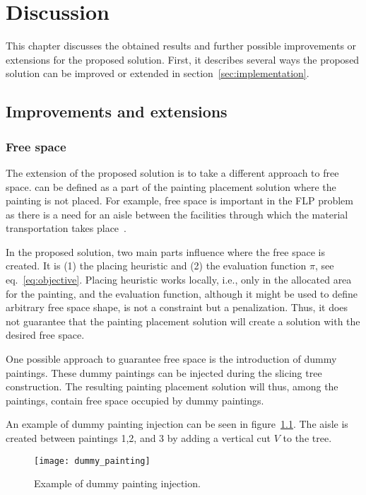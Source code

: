 \chapter{Discussion}\label{ch:discussion}

This chapter discusses the obtained results and further possible improvements or extensions for the proposed solution.
First, it describes several ways the proposed solution can be improved or extended in section~\ref{sec:implementation}.


\section{Improvements and extensions}\label{sec:improvements}

\subsection{Free space}\label{subsec:free-space}

The extension of the proposed solution is to take a different approach to free space.
 can be defined as a part of the painting placement solution where the painting is not placed.
For example, free space is important in the FLP problem as there is a need for an aisle between the facilities
through which the material transportation takes place~\cite{scholzExtensionsSTaTSPractical2010}.

In the proposed solution, two main parts influence where the free space is created.
It is (1) the placing heuristic and (2) the evaluation function $\pi$, see eq.~\ref{eq:objective}.
Placing heuristic works locally, i.e., only in the allocated area for the painting, and the evaluation
function, although it might be used to define arbitrary free space shape, is not a constraint but a penalization.
Thus, it does not guarantee that the painting placement solution will create a solution with the desired free space.

One possible approach to guarantee free space is the introduction of dummy paintings.
These dummy paintings can be injected during the slicing tree construction.
The resulting painting placement solution will thus, among the paintings, contain free space occupied by dummy paintings.

An example of dummy painting injection can be seen in figure~\ref{fig:dummy-painting}.
The aisle is created between paintings 1,2, and 3 by adding a vertical cut $V$ to the tree.


\begin{figure}[h!]
    \texttt{[image: dummy\_painting]}
    \caption{Example of dummy painting injection.}
    \label{fig:dummy-painting}
\end{figure}

